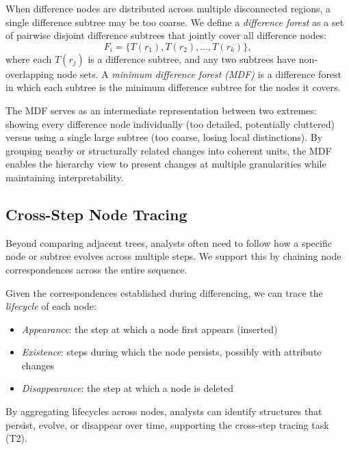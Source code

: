 When difference nodes are distributed across multiple disconnected regions, a single difference subtree may be too coarse. We define a \emph{difference forest} as a set of pairwise disjoint difference subtrees that jointly cover all difference nodes:
\[
F_i = \{T(r_1), T(r_2), \dots, T(r_k)\},
\]
where each $T(r_j)$ is a difference subtree, and any two subtrees have non-overlapping node sets. A \emph{minimum difference forest (MDF)} is a difference forest in which each subtree is the minimum difference subtree for the nodes it covers.

The MDF serves as an intermediate representation between two extremes: showing every difference node individually (too detailed, potentially cluttered) versus using a single large subtree (too coarse, losing local distinctions). By grouping nearby or structurally related changes into coherent units, the MDF enables the hierarchy view to present changes at multiple granularities while maintaining interpretability.

\subsection{Cross-Step Node Tracing}
\label{sec:tracing}

Beyond comparing adjacent trees, analysts often need to follow how a specific node or subtree evolves across multiple steps. We support this by chaining node correspondences across the entire sequence.

Given the correspondences established during differencing, we can trace the \emph{lifecycle} of each node:
\begin{itemize}
	\item \emph{Appearance}: the step at which a node first appears (inserted)
	\item \emph{Existence}: steps during which the node persists, possibly with attribute changes
	\item \emph{Disappearance}: the step at which a node is deleted
\end{itemize}
By aggregating lifecycles across nodes, analysts can identify structures that persist, evolve, or disappear over time, supporting the cross-step tracing task (T2).

